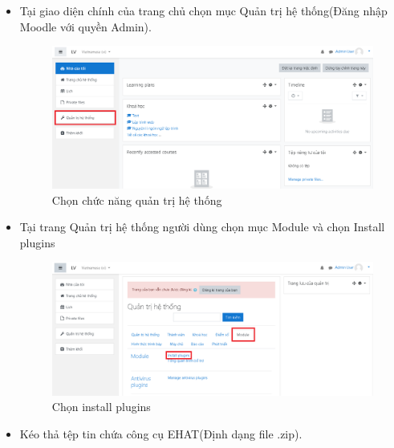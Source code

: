 \begin{itemize}
	\item Tại giao diện chính của trang chủ chọn mục Quản trị hệ thống(Đăng nhập Moodle với quyền Admin).
	
	\begin{center}
		\begin{figure}[htp]
			\begin{center}
				\includegraphics[width=1\linewidth]{img/6}
			\end{center}
			\caption{Chọn chức năng quản trị hệ thống}
			\label{refhinh36}
		\end{figure}
	\end{center}

	\item Tại trang Quản trị hệ thống người dùng chọn mục Module và chọn Install plugins
	
	\begin{center}
		\begin{figure}[htp]
			\begin{center}
				\includegraphics[width=1\linewidth]{img/7}
			\end{center}
			\caption{Chọn install plugins}
			\label{refhinh37}
		\end{figure}
	\end{center}
	
	\newpage
	\item Kéo thả tệp tin chứa công cụ EHAT(Định dạng file .zip).
	

\end{itemize}
